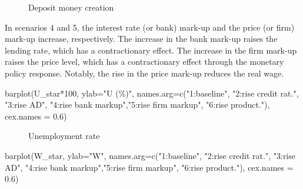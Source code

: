 \documentclass[
  letterpaper,
  DIV=11,
  numbers=noendperiod]{scrreprt}
\newenvironment{Shaded}{\begin{snugshade}}{\end{snugshade}}
\newcommand{\AttributeTok}[1]{\textcolor[rgb]{0.40,0.45,0.13}{#1}}
\newcommand{\DecValTok}[1]{\textcolor[rgb]{0.68,0.00,0.00}{#1}}
\newcommand{\FloatTok}[1]{\textcolor[rgb]{0.68,0.00,0.00}{#1}}
\newcommand{\FunctionTok}[1]{\textcolor[rgb]{0.28,0.35,0.67}{#1}}
\newcommand{\NormalTok}[1]{\textcolor[rgb]{0.00,0.23,0.31}{#1}}
\newcommand{\SpecialCharTok}[1]{\textcolor[rgb]{0.37,0.37,0.37}{#1}}
\newcommand{\StringTok}[1]{\textcolor[rgb]{0.13,0.47,0.30}{#1}}
\begin{document}
\begin{figure}[H]


\caption{\label{fig-money-pkmacro}Deposit money creation}

\end{figure}%

In scenarios 4 and 5, the interest rate (or bank) mark-up and the price
(or firm) mark-up increase, respectively. The increase in the bank
mark-up raises the lending rate, which has a contractionary effect. The
increase in the firm mark-up raises the price level, which has a
contractionary effect through the monetary policy response. Notably, the
rise in the price mark-up reduces the real wage.

\begin{Shaded}
\begin{Highlighting}[]
\FunctionTok{barplot}\NormalTok{(U\_star}\SpecialCharTok{*}\DecValTok{100}\NormalTok{, }\AttributeTok{ylab=}\StringTok{"U (\%)"}\NormalTok{, }\AttributeTok{names.arg=}\FunctionTok{c}\NormalTok{(}\StringTok{"1:baseline"}\NormalTok{, }\StringTok{"2:rise credit rat."}\NormalTok{, }\StringTok{"3:rise AD"}\NormalTok{,}
                                              \StringTok{"4:rise bank markup"}\NormalTok{,}\StringTok{"5:rise firm markup"}\NormalTok{, }\StringTok{"6:rise product."}\NormalTok{), }\AttributeTok{cex.names =} \FloatTok{0.6}\NormalTok{)}
\end{Highlighting}
\end{Shaded}

\begin{figure}[H]


\caption{\label{fig-unemployment-pkmacro}Unemployment rate}

\end{figure}%

\begin{Shaded}
\begin{Highlighting}[]
\FunctionTok{barplot}\NormalTok{(W\_star, }\AttributeTok{ylab=}\StringTok{"W"}\NormalTok{, }\AttributeTok{names.arg=}\FunctionTok{c}\NormalTok{(}\StringTok{"1:baseline"}\NormalTok{, }\StringTok{"2:rise credit rat."}\NormalTok{, }\StringTok{"3:rise AD"}\NormalTok{,}
                                      \StringTok{"4:rise bank markup"}\NormalTok{,}\StringTok{"5:rise firm markup"}\NormalTok{, }\StringTok{"6:rise product."}\NormalTok{), }\AttributeTok{cex.names =} \FloatTok{0.6}\NormalTok{)}
\end{Highlighting}
\end{Shaded}
\end{document}
